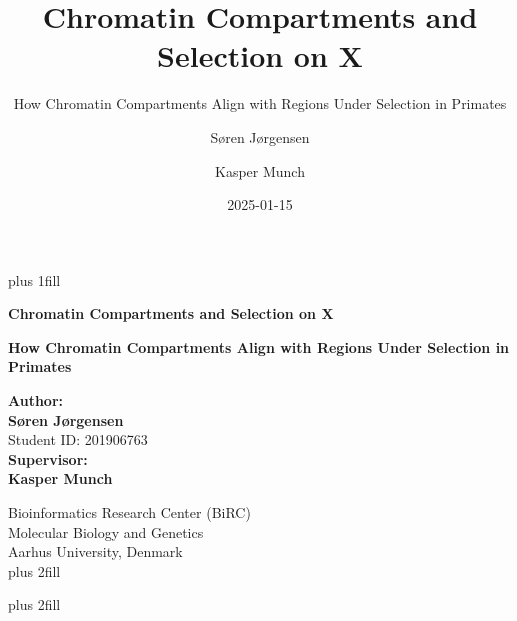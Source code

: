 \documentclass[
  11pt,
  a4paper,
]{scrbook}
\title{Chromatin Compartments and Selection on X}
\subtitle{How Chromatin Compartments Align with Regions Under Selection
in Primates}
\author{Søren Jørgensen \and Kasper Munch}
\date{2025-01-15}
\begin{document}
\frontmatter
\cleardoublepage
\thispagestyle{empty}
{\centering
\hbox{}\vskip 0cm plus 1fill

{%
\Huge\bfseries Chromatin Compartments and Selection on X \par}
\vspace{3ex}
{\Large\bfseries How Chromatin Compartments Align with Regions Under
Selection in Primates \par}
\vspace{5ex}

        {\bfseries Author: \\ \vspace{0.5ex}}
        {\bfseries\Large Søren Jørgensen \\ \vspace{0.7ex}}
            {\large Student ID: 201906763 \\ \vspace{1.2ex} }
        {\bfseries Supervisor: \\ \vspace{0.5ex}}
        {\bfseries\Large Kasper Munch \\ \vspace{0.7ex}}
        \par \vspace{0.7ex}
        {\large Bioinformatics Research Center (BiRC) \\ \vspace{0.7ex}}
        {\large Molecular Biology and Genetics \\ \vspace{0.7ex}}
        {\large Aarhus University, Denmark \\ \vspace{2ex}}
%
\vskip 0cm plus 2fill

{ \par}
\vskip 0cm plus 2fill

}
\end{document}
